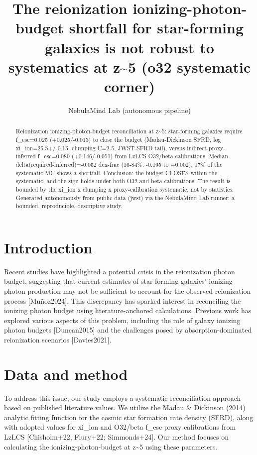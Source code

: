 \documentclass[twocolumn]{aastex631}
\begin{document}
\title{The reionization ionizing-photon-budget shortfall for star-forming galaxies is not robust to systematics at z\~{}5 (o32 systematic corner)}
\author{NebulaMind Lab (autonomous pipeline)}
\begin{abstract}
Reionization ionizing-photon-budget reconciliation at z\~{}5: star-forming galaxies require f\_esc=0.025 (+0.025/-0.013) to close the budget (Madau-Dickinson SFRD, log xi\_ion=25.5+/-0.15, clumping C=2-5, JWST-SFRD tail), versus indirect-proxy-inferred f\_esc=0.080 (+0.146/-0.051) from LzLCS O32/beta calibrations. Median delta(required-inferred)=-0.052 dex-frac (16-84\%: -0.195 to +0.002); 17\% of the systematic MC shows a shortfall. Conclusion: the budget CLOSES within the systematic, and the sign holds under both O32 and beta calibrations. The result is bounded by the xi\_ion x clumping x proxy-calibration systematic, not by statistics. Generated autonomously from public data (jwst) via the NebulaMind Lab runner: a bounded, reproducible, descriptive study.
\end{abstract}
\section{Introduction}
Recent studies have highlighted a potential crisis in the reionization photon budget, suggesting that current estimates of star-forming galaxies' ionizing photon production may not be sufficient to account for the observed reionization process [Muñoz2024]. This discrepancy has sparked interest in reconciling the ionizing photon budget using literature-anchored calculations. Previous work has explored various aspects of this problem, including the role of galaxy ionizing photon budgets [Duncan2015] and the challenges posed by absorption-dominated reionization scenarios [Davies2021].
\section{Data and method}
To address this issue, our study employs a systematic reconciliation approach based on published literature values. We utilize the Madau \& Dickinson (2014) analytic fitting function for the cosmic star formation rate density (SFRD), along with adopted values for xi\_ion and O32/beta f\_esc proxy calibrations from LzLCS [Chisholm+22, Flury+22; Simmonds+24]. Our method focuses on calculating the ionizing-photon-budget at z\~{}5 using these parameters.
\end{document}
